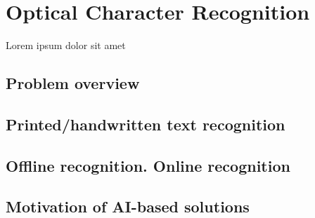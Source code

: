 \chapter{Optical Character Recognition}
\label{chap:ch3}


\par Lorem ipsum dolor sit amet

\section{Problem overview}
\label{sec:ch3sec1}

\section{Printed/handwritten text recognition}
\label{sec:ch3sec1}

\section{Offline recognition. Online recognition}

\section{Motivation of AI-based solutions}
\label{sec:ch3sec1}
